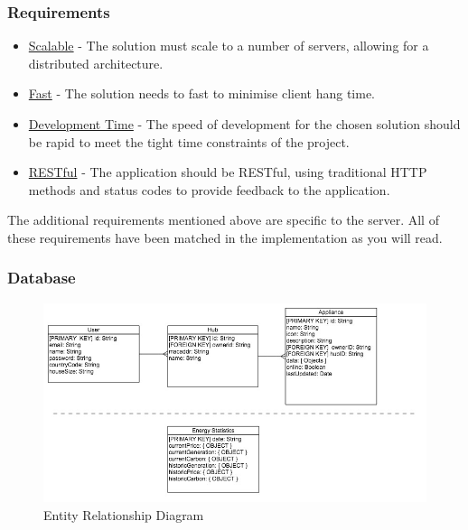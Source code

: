 \documentclass[draft,preprint,12pt,3p]{elsarticle}
\begin{document}
\subsubsection{Requirements}
\begin{itemize}
\item \underline{Scalable} - The solution must scale to a number of servers, allowing for a distributed architecture.
\item \underline{Fast} - The solution needs to fast to minimise client hang time.
\item \underline{Development Time} - The speed of development for the chosen solution should be rapid to meet the tight time constraints of the project.
\item \underline{RESTful} - The application should be RESTful, using traditional HTTP methods and status codes to provide feedback to the application.
\end{itemize}
The additional requirements mentioned above are specific to the server. All of these requirements have been matched in the implementation as you will read.

\subsubsection{Database}
\begin{figure}[H]
    \centering
    \includegraphics[width=\columnwidth]{diagrams/erd}
    \caption {Entity Relationship Diagram}
\end{figure}
\end{document}

